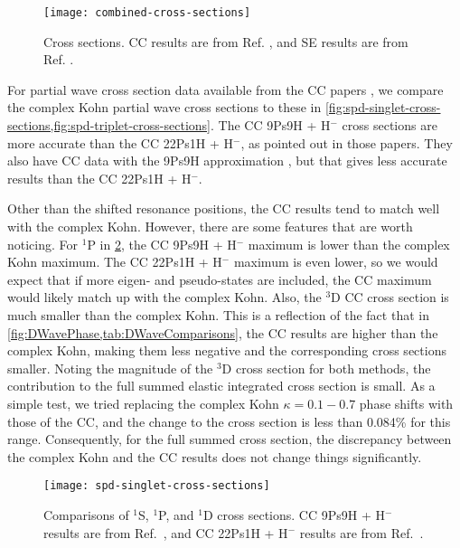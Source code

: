 \documentclass[Dissertation.tex]{subfiles}
\begin{document}
\begin{figure}[H]
	\centering
	\texttt{[image: combined-cross-sections]}
	\caption[Cross sections.]{Cross sections. CC results are from Ref. \cite{Walters2004}, and SE results are from Ref. \cite{Hara1975}.}
	\label{fig:combined-cross-sections}
\end{figure}

For partial wave cross section data available from the CC papers
\cite{Walters2004,Blackwood2002,Blackwood2002b}, we compare the complex Kohn
partial wave cross sections to these in
\cref{fig:spd-singlet-cross-sections,fig:spd-triplet-cross-sections}.
The CC 9Ps9H + H$^-$ cross sections are more accurate than the CC 22Ps1H + H$^-$,
as pointed out in those papers. They also have CC data with the 9Ps9H
approximation \cite{Blackwood2002}, but that gives less accurate results than
the CC 22Ps1H + H$^-$.

Other than the shifted resonance positions, the CC results tend to match well
with the complex Kohn. However, there are some features that are worth
noticing. For $^1$P in \cref{fig:spd-singlet-cross-sections}, the CC
9Ps9H + H$^-$ maximum is lower than the complex Kohn maximum. The CC
22Ps1H + H$^-$ maximum is even lower, so we would expect that if more
eigen- and pseudo-states are included, the CC maximum would likely match up 
with the complex Kohn. Also, the $^3$D CC cross section is much smaller than
the complex Kohn. This is a reflection of the fact that in
\cref{fig:DWavePhase,tab:DWaveComparisons}, the CC results are higher than the
complex Kohn, making them less negative and the corresponding cross sections
smaller. Noting the magnitude of the $^3$D cross section for both methods, the
contribution to the full summed elastic integrated cross section is small.
As a simple test, we tried replacing the complex Kohn $\kappa = 0.1 - 0.7$
phase shifts with those of the CC, and the change to the cross section is
less than 0.084\% for this range. Consequently, for the full summed
cross section, the discrepancy between the complex Kohn and the CC results
does not change things significantly.

\begin{figure}[H]
	\centering
	\texttt{[image: spd-singlet-cross-sections]}
	\caption[Comparisons of $^1$S, $^1$P, and $^1$D cross sections.]{Comparisons of $^1$S, $^1$P, and $^1$D cross sections. CC 9Ps9H + H$^-$ results are from Ref.~\cite{Walters2004}, and CC 22Ps1H + H$^-$ results are from Ref.~\cite{Blackwood2002b}.}
	\label{fig:spd-singlet-cross-sections}
\end{figure}
\end{document}
